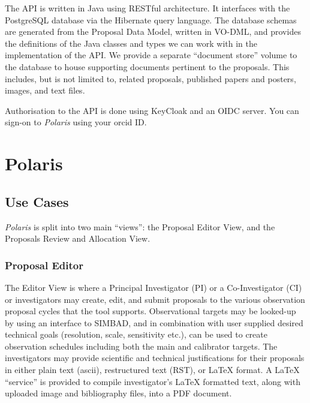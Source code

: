 \documentclass[11pt,twoside]{article}
\begin{document}

The API is written in Java using RESTful architecture.
It interfaces with the PostgreSQL database via the Hibernate query language.
The database schemas are generated from the Proposal Data Model, written in VO-DML, and provides the
definitions of the Java classes and types we can work with in the implementation of the API\@.
We provide a separate ``document store'' volume to the database to house supporting documents pertinent
to the proposals.
This includes, but is not limited to, related proposals, published papers and posters, images, and text
files.

Authorisation to the API is done using KeyCloak and an OIDC server.
You can sign-on to \emph{Polaris} using your orcid ID\@.


\section{Polaris}\label{sec:polaris}

\subsection{Use Cases}\label{subsec:use-cases}

\emph{Polaris} is split into two main ``views'': the Proposal Editor View, and the Proposals Review
and Allocation View.

\subsubsection{Proposal Editor}\label{subsubsec:proposal-editor}


The Editor View is where a Principal Investigator (PI) or a Co-Investigator (CI) or investigators may create,
edit, and submit proposals to the various observation proposal cycles that the tool supports.
Observational targets may be looked-up by using an interface to SIMBAD, and in combination with user
supplied desired technical goals (resolution, scale, sensitivity etc.), can be used to create observation
schedules including both the main and calibrator targets.
The investigators may provide scientific and technical justifications for their proposals in either plain text
(ascii), restructured text (RST), or LaTeX format.
A LaTeX ``service'' is provided to compile investigator's LaTeX formatted text, along with uploaded image
and bibliography files, into a PDF document.
\end{document}

